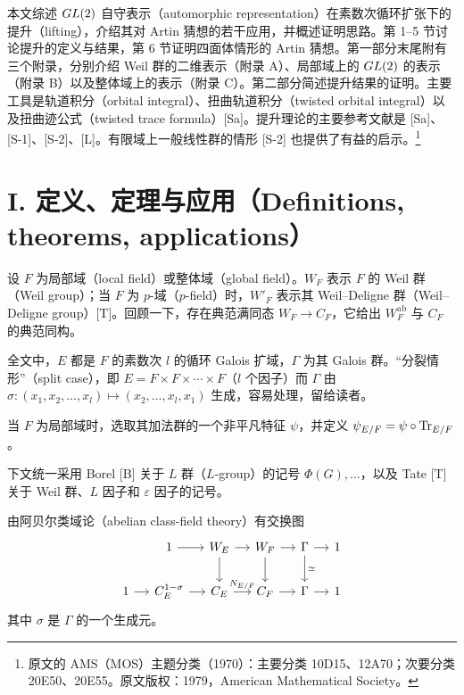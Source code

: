 
本文综述 $GL(2)$ 自守表示（automorphic representation）在素数次循环扩张下的提升（lifting），介绍其对 Artin 猜想的若干应用，并概述证明思路。第 1--5 节讨论提升的定义与结果，第 6 节证明四面体情形的 Artin 猜想。第一部分末尾附有三个附录，分别介绍 Weil 群的二维表示（附录 A）、局部域上的 $GL(2)$ 的表示（附录 B）以及整体域上的表示（附录 C）。第二部分简述提升结果的证明。主要工具是轨道积分（orbital integral）、扭曲轨道积分（twisted orbital integral）以及扭曲迹公式（twisted trace formula）[Sa]。提升理论的主要参考文献是 [Sa]、[S-1]、[S-2]、[L]。有限域上一般线性群的情形 [S-2] 也提供了有益的启示。\footnote{原文的 AMS（MOS）主题分类（1970）：主要分类 10D15、12A70；次要分类 20E50、20E55。原文版权：1979，American Mathematical Society。}

\section*{I. 定义、定理与应用（Definitions, theorems, applications）}
设 $F$ 为局部域（local field）或整体域（global field）。$W_F$ 表示 $F$ 的 Weil 群（Weil group）；当 $F$ 为 $p$-域（$p$-field）时，$W'_F$ 表示其 Weil--Deligne 群（Weil--Deligne group）[T]。回顾一下，存在典范满同态 $W_F\to C_F$，它给出 $W_F^{\mathrm{ab}}$ 与 $C_F$ 的典范同构。

全文中，$E$ 都是 $F$ 的素数次 $l$ 的循环 Galois 扩域，$\Gamma$ 为其 Galois 群。“分裂情形”（split case），即 $E=F\times F\times\cdots\times F$（$l$ 个因子）而 $\Gamma$ 由 $\sigma:(x_1,x_2,\ldots,x_l)\mapsto(x_2,\ldots,x_l,x_1)$ 生成，容易处理，留给读者。

当 $F$ 为局部域时，选取其加法群的一个非平凡特征 $\psi$，并定义 $\psi_{E/F}=\psi\circ\operatorname{Tr}_{E/F}$。

下文统一采用 Borel [B] 关于 $L$ 群（$L$-group）的记号 $\Phi(G),\ldots$，以及 Tate [T] 关于 Weil 群、$L$ 因子和 $\varepsilon$ 因子的记号。

由阿贝尔类域论（abelian class-field theory）有交换图
\[
 \begin{tikzcd}[column sep=small]
 &1\arrow[r]&W_E\arrow[r]\arrow[d]&W_F\arrow[r]\arrow[d]&\Gamma\arrow[r]\arrow[d,"\simeq"]&1\\
 1\arrow[r]&C_E^{1-\sigma}\arrow[r]&C_E\arrow[r,"N_{E/F}"]&C_F\arrow[r]&\Gamma\arrow[r]&1
 \end{tikzcd}
\]
其中 $\sigma$ 是 $\Gamma$ 的一个生成元。

